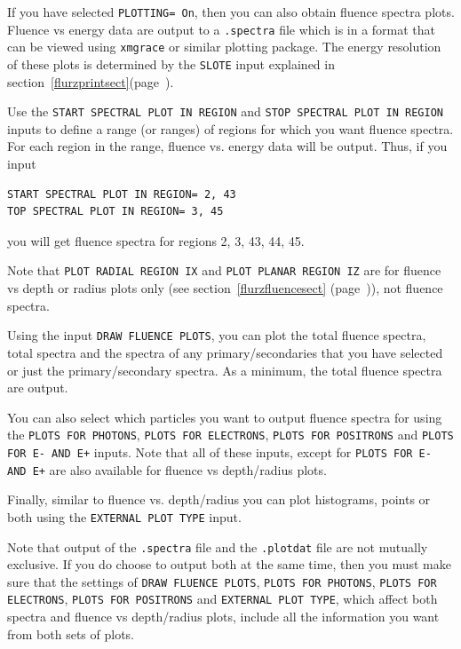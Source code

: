 \documentclass[12pt,twoside]{article}  %
\newcommand{\lpage}[1]{(page~\pageref{#1})}
\begin{document}
If you have selected {\tt PLOTTING= On}, then you can also obtain
fluence spectra plots.  Fluence vs energy data are output to a {\tt .spectra}
file which is in a format that can be viewed using {\tt xmgrace} or
similar plotting package.  The energy resolution of these plots is
determined by the {\tt SLOTE} input explained in
section~\ref{flurzprintsect}\lpage{flurzprintsect}.

Use the {\tt START SPECTRAL PLOT IN REGION} and
{\tt STOP SPECTRAL PLOT IN REGION} inputs to define a range (or ranges) of
regions
for which you want fluence spectra.  For each region in the range, fluence
vs. energy data will be output.  Thus, if you input
\begin{verbatim}
START SPECTRAL PLOT IN REGION= 2, 43
TOP SPECTRAL PLOT IN REGION= 3, 45
\end{verbatim}
you will get fluence spectra for regions 2, 3, 43, 44, 45.

Note that {\tt PLOT RADIAL REGION IX} and {\tt PLOT PLANAR REGION IZ}
are for fluence vs depth or radius plots only (see
section~\ref{flurzfluencesect} \lpage{flurzfluencesect}), not fluence
spectra.

Using the input
{\tt DRAW FLUENCE PLOTS}, you can plot the total fluence spectra,
total spectra and the spectra of any primary/secondaries that you
have selected or just the primary/secondary
spectra.  As a minimum, the total fluence spectra are output.

You can also select which particles you want to output fluence spectra
for using the {\tt PLOTS FOR PHOTONS}, {\tt PLOTS FOR ELECTRONS},
{\tt PLOTS FOR POSITRONS} and {\tt PLOTS FOR E- AND E+} inputs.
Note that all of these inputs, except for {\tt PLOTS FOR E- AND E+} are
also available for fluence vs depth/radius plots.

Finally, similar to fluence vs. depth/radius you can plot histograms,
points or both using the {\tt EXTERNAL PLOT TYPE} input.

Note that output of the {\tt .spectra} file and the {\tt .plotdat} file
are not mutually exclusive.  If you do choose to output both at the same
time, then you must make sure that the settings of
{\tt DRAW FLUENCE PLOTS}, {\tt PLOTS FOR PHOTONS}, {\tt PLOTS FOR ELECTRONS}, {\tt PLOTS FOR POSITRONS} and {\tt EXTERNAL PLOT TYPE}, which
affect both spectra and fluence vs depth/radius plots, include all the
information you want from both sets of plots.

\end{document}
